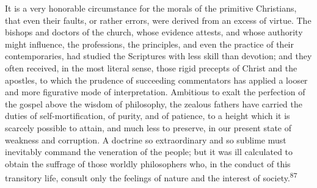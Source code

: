 


It is a very honorable circumstance for the morals of the
primitive Christians, that even their faults, or rather errors,
were derived from an excess of virtue. The bishops and doctors of
the church, whose evidence attests, and whose authority might
influence, the professions, the principles, and even the practice
of their contemporaries, had studied the Scriptures with less
skill than devotion; and they often received, in the most literal
sense, those rigid precepts of Christ and the apostles, to which
the prudence of succeeding commentators has applied a looser and
more figurative mode of interpretation. Ambitious to exalt the
perfection of the gospel above the wisdom of philosophy, the
zealous fathers have carried the duties of self-mortification, of
purity, and of patience, to a height which it is scarcely
possible to attain, and much less to preserve, in our present
state of weakness and corruption. A doctrine so extraordinary and
so sublime must inevitably command the veneration of the people;
but it was ill calculated to obtain the suffrage of those worldly
philosophers who, in the conduct of this transitory life, consult
only the feelings of nature and the interest of society.\textsuperscript{87}


